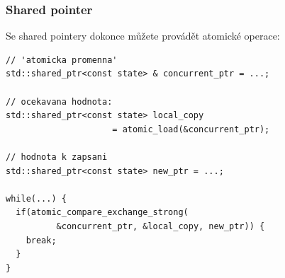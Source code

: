 \documentclass[usenames,dvipsnames,9pt]{beamer}
\begin{document}
\begin{frame}
\begin{center}
  \end{center}
\end{frame}

\begin{frame}[fragile]
  \frametitle{Shared pointer}

  Se shared pointery dokonce můžete provádět atomické operace:
  \begin{verbatim}
// 'atomicka promenna'
std::shared_ptr<const state> & concurrent_ptr = ...;

// ocekavana hodnota:
std::shared_ptr<const state> local_copy
                     = atomic_load(&concurrent_ptr);

// hodnota k zapsani
std::shared_ptr<const state> new_ptr = ...;

while(...) {
  if(atomic_compare_exchange_strong(
          &concurrent_ptr, &local_copy, new_ptr)) {
    break;
  }
}
  \end{verbatim}
\end{frame}
\end{document}
